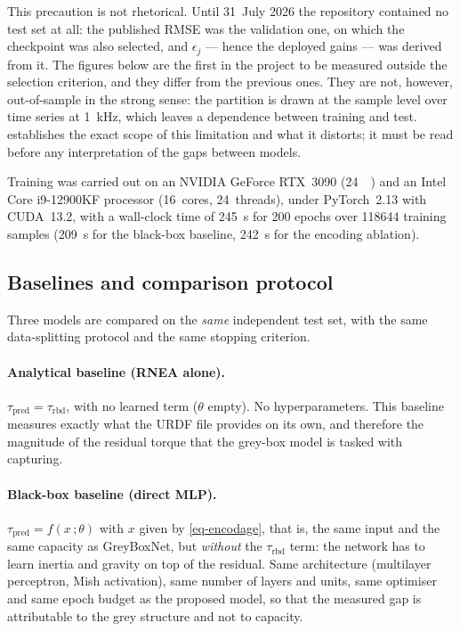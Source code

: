 \documentclass[a4paper, oneside]{article}
\newcommand{\taurbd}{\ensuremath{\tau_{\mathrm{rbd}}}}
\newcommand{\taupred}{\ensuremath{\tau_{\mathrm{pred}}}}
\begin{document}
This precaution is not rhetorical. Until 31~July 2026 the repository contained
no test set at all: the published RMSE was the validation one, on which the
checkpoint was also selected, and $\epsilon_j$ --- hence the deployed gains ---
was derived from it. The figures below are the first in the project to be
measured outside the selection criterion, and they differ from the previous
ones. They are not, however, out-of-sample in the strong sense: the partition
is drawn at the sample level over time series at \SI{1}{\kilo\hertz}, which
leaves a dependence between training and test. 
establishes the exact scope of this limitation and what it distorts; it must be
read before any interpretation of the gaps between models.

Training was carried out on an NVIDIA GeForce RTX~3090
(\SI{24}{\gibi\byte}) and an Intel Core i9-12900KF processor (16~cores,
24~threads), under PyTorch~2.13 with CUDA~13.2, with a wall-clock time of
\SI{245}{\second} for \num{200} epochs over
\SI{118644}{} training samples (\SI{209}{\second} for the black-box baseline,
\SI{242}{\second} for the encoding ablation).

\subsection{Baselines and comparison protocol}
\label{sec-baselines}

Three models are compared on the \emph{same} independent test set, with the
same data-splitting protocol and the same stopping criterion.

\paragraph{Analytical baseline (RNEA alone).}
$\taupred = \taurbd$, with no learned term ($\theta$ empty). No
hyperparameters. This baseline measures exactly what the URDF file provides on
its own, and therefore the magnitude of the residual torque that the grey-box
model is tasked with capturing.

\paragraph{Black-box baseline (direct MLP).}
$\taupred = f(x\,;\theta)$ with $x$ given by \cref{eq-encodage}, that is, the
same input and the same capacity as GreyBoxNet, but \emph{without} the
$\taurbd$ term: the network has to learn inertia and gravity on top of the
residual. Same architecture (multilayer perceptron, Mish activation), same
number of layers and units, same optimiser and same epoch budget as the
proposed model, so that the measured gap is attributable to the grey structure
and not to capacity.
\end{document}
